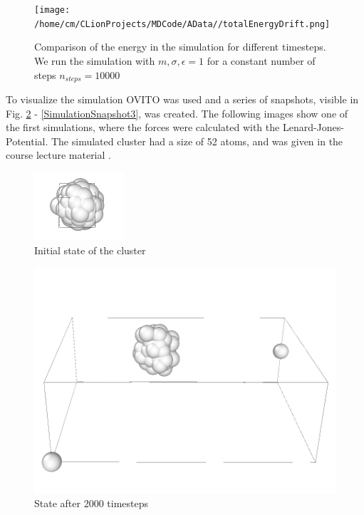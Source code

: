 \begin{figure}
	\begin{center}
		\texttt{[image: /home/cm/CLionProjects/MDCode/AData//totalEnergyDrift.png]}
	\end{center}
	\caption[Comparison of the energy in the simulation with different timesteps]{Comparison of the energy in the simulation for different timesteps. We run the simulation with $m, \sigma, \epsilon = 1$ for a constant number of steps $n_{steps} = 10000 $}
	\label{SimWithTimestep}
\end{figure}
\par
To visualize the simulation OVITO \cite{ovito} was used and a series of snapshots, visible in Fig. \ref{SimulationSnapshot1} - \ref{SimulationSnapshot3}, was created. The following images show one of the first simulations, where the forces were calculated with the Lenard-Jones-Potential. The simulated cluster had a size of 52 atoms, and was given in the course lecture material \cite{molDymCourse}.
\begin{figure}
	\begin{center}
		\includegraphics[scale= 0.65]{Figure/1ImageS.png}
	\end{center}
	\caption[Simulation Snapshot 1]{Initial state of the cluster}
	\label{SimulationSnapshot1}
\end{figure}

\begin{figure}
	\begin{center}
		\includegraphics[scale= 0.75]{Figure/2ImageS.png}
	\end{center}
	\caption[Simulation Snapshot 2]{State after 2000 timesteps}
	\label{SimulationSnapshot2}
\end{figure}

